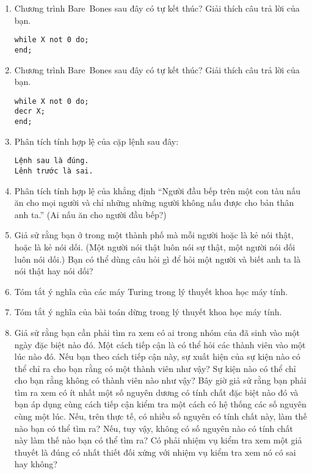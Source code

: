 \begin{multicols}{2}
\begin{enumerate}
  \item Chương trình Bare~Bones sau đây có tự kết thúc? Giải thích câu trả lời của bạn.
    \begin{flushleft}
      \texttt{while X not 0 do;}\\
      \texttt{end;}\\
    \end{flushleft}

  \item Chương trình Bare~Bones sau đây có tự kết thúc? Giải thích câu trả lời của bạn.
    \begin{flushleft}
      \texttt{while X not 0 do;}\\
      \quad \texttt{decr X;}\\
      \texttt{end;}\\
    \end{flushleft}

  \item Phân tích tính hợp lệ của cặp lệnh sau đây:
    \begin{flushleft}
      \texttt{Lệnh sau là đúng.}\\
      \texttt{Lênh trước là sai.}\\
    \end{flushleft}

  \item Phân tích tính hợp lệ của khẳng định ``Người đầu bếp trên một con tàu nấu ăn cho
    mọi người và chỉ những những người không nấu được cho bản thân anh ta.'' (Ai nấu ăn
    cho người đầu bếp?)

  \item Giả sử rằng bạn ở trong một thành phố mà mỗi người hoặc là kẻ nói thật, hoặc là kẻ
    nói dối. (Một người nói thật luôn nói sự thật, một người nói dối luôn nói dối.) Bạn có
    thể dùng câu hỏi gì để hỏi một người và biết anh ta là nói thật hay nói dối?

  \item Tóm tắt ý nghĩa của các máy Turing trong lý thuyết khoa học máy tính.

  \item Tóm tắt ý nghĩa của bài toán dừng trong lý thuyết khoa học máy tính.

  \item Giả sử rằng bạn cần phải tìm ra xem có ai trong nhóm của đã sinh vào một ngày đặc
    biệt nào đó. Một cách tiếp cận là có thể hỏi các thành viên vào một lúc nào đó. Nếu
    bạn theo cách tiếp cận này, sự xuất hiện của sự kiện nào có thể chỉ ra cho bạn rằng có
    một thành viên như vậy? Sự kiện nào có thể chỉ cho bạn rằng không có thành viên nào
    như vậy? Bây giờ giả sử rằng bạn phải tìm ra xem có ít nhất một số nguyên dương có
    tính chất đặc biệt nào đó và bạn áp dụng cùng cách tiếp cận kiểm tra một cách có hệ
    thống các số nguyên cùng một lúc. Nếu, trên thực tế, có nhiều số nguyên có tính chất
    này, làm thế nào bạn có thể tìm ra? Nếu, tuy vậy, không có số nguyên nào có tính chất
    này làm thế nào bạn có thể tìm ra? Có phải nhiệm vụ kiểm tra xem một giả thuyết là
    đúng có nhất thiết đối xứng với nhiệm vụ kiểm tra xem nó có sai hay không?



\end{enumerate}
\end{multicols}

